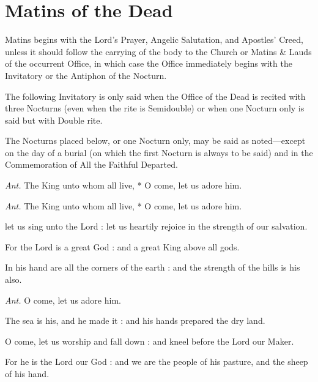 \section{Matins of the Dead}
\begin{secrubric}
Matins begins with the Lord's Prayer, Angelic Salutation, and Apostles' Creed, unless it should follow the carrying of the body to the Church or Matins \& Lauds of the occurrent Office, in which case the Office immediately begins with the Invitatory or the Antiphon of the Nocturn.
\end{secrubric}
\begin{secrubric}
    The following Invitatory is only said when the Office of the Dead is recited with three Nocturns (even when the rite is Semidouble) or when one Nocturn only is said but with Double rite.
\end{secrubric}
\begin{secrubric}
    The Nocturns placed below, or one Nocturn only, may be said as noted---except on the day of a burial (on which the first Nocturn is always to be said) and in the Commemoration of All the Faithful Departed.%
\end{secrubric}
\par\noindent
\textit{Ant.} The King unto whom all live, * O come, let us adore him.\par
\textit{Ant.} The King unto whom all live, * O come, let us adore him.\par
{} let us sing unto the Lord : let us heartily rejoice in the strength of our salvation.\par
{}
For the Lord is a great God : and a great King above all gods.\par
{}In his hand are all the corners of the earth : and the strength of the hills is his also.\par
\textit{Ant.} O come, let us adore him.\par
{}The sea is his, and he made it : and his hands prepared the dry land.\par
{}O come, let us worship and fall down : and kneel before the Lord our Maker.\par
{}For he is the Lord our God : and we are the people of his pasture, and the sheep of his hand.\par
